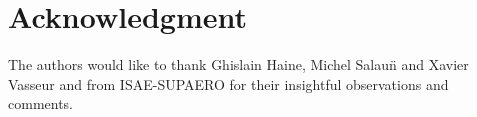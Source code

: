 \documentclass[letterpaper, 10 pt, conference]{ieeeconf}
\begin{document}


\section*{Acknowledgment}
The authors would like to thank Ghislain Haine, Michel Salau\"n and Xavier Vasseur and from ISAE-SUPAERO for their insightful observations and comments.




%
%



%
%
\end{document}
